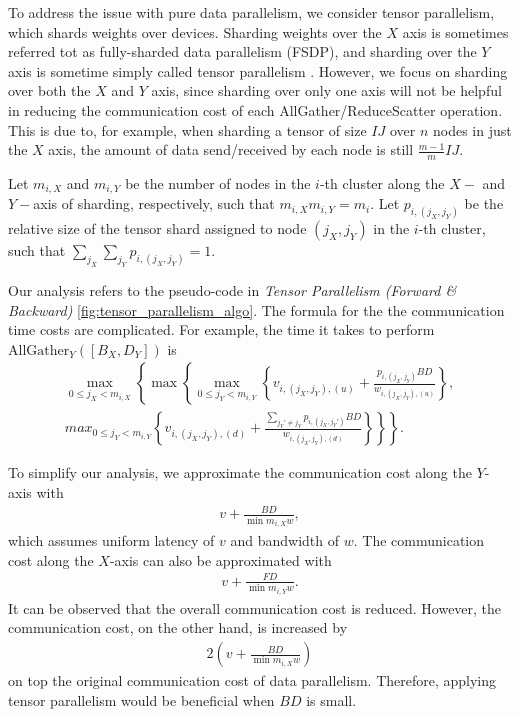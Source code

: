 \documentclass{article}
\begin{document}

To address the issue with pure data parallelism, we consider tensor parallelism, which shards weights over devices. Sharding weights over the $X$ axis is sometimes referred tot as fully-sharded data parallelism (FSDP), and sharding over the $Y$ axis is sometime simply called tensor parallelism \cite[Part 5]{scaling-book}. However, we focus on sharding over both the $X$ and $Y$ axis, since sharding over only one axis will not be helpful in reducing the communication cost of each AllGather/ReduceScatter operation. This is due to, for example, when sharding a tensor of size $IJ$ over $n$ nodes in just the $X$ axis, the amount of data send/received by each node is still $\frac{m - 1}{m} IJ$.

Let $m_{i, X}$ and $m_{i, Y}$ be the number of nodes in the $i$-th cluster along the $X-$ and $Y-$axis of sharding, respectively, such that $m_{i, X} m_{i, Y} = m_i$. Let $p_{i, (j_X, j_Y)}$ be the relative size of the tensor shard assigned to node $(j_X, j_Y)$ in the $i$-th cluster, such that $\sum_{j_X} \sum_{j_Y} p_{i, (j_X, j_Y)} = 1$.

Our analysis refers to the pseudo-code in \textit{Tensor Parallelism (Forward \& Backward)} \ref{fig:tensor_parallelism_algo}. The formula for the the communication time costs are complicated. For example, the time it takes to perform $\mathrm{AllGather}_Y([B_X, D_Y])$ is
\begin{align*}
    \max_{0 \le j_X < m_{i, X}} \left\{\max \left\{\max_{0\le j_Y < m_{i, Y}} \left\{v_{i, (j_X, j_Y), (u)} + \frac{p_{i, (j_X, j_Y)} BD}{w_{i, (j_X, j_Y), (u)}} \right\}, \right. \right. \\
    \left. \left. max_{0\le j_Y < m_{i, Y}} \left\{v_{i, (j_X, j_Y), (d)}+ \frac{\sum_{j_Y' \ne j_Y} p_{i, (j_X, j_Y')} BD}{w_{i, (j_X, j_Y), (d)}} \right\} \right\} \right\}.
\end{align*}

To simplify our analysis, we approximate the communication  cost along the $Y$-axis with
\begin{align}
    v + \frac{BD}{\min m_{i, X} w},
\end{align}
which assumes uniform latency of $v$ and bandwidth of $w$. The communication cost along the $X$-axis can also be approximated with
\begin{align}
    v + \frac{FD}{\min m_{i, Y} w}.
\end{align}
It can be observed that the overall communication cost is reduced. However, the communication cost, on the other hand, is increased by
\begin{align}
    2\left(v + \frac{BD}{\min m_{i, X} w}\right)
\end{align}
on top the original communication cost of data parallelism. Therefore, applying tensor parallelism would be beneficial when $BD$ is small.
\end{document}
